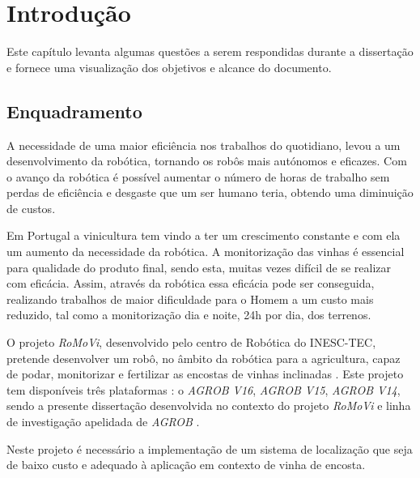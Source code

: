 \chapter{Introdução} \label{chap:introdução}
Este capítulo levanta algumas questões a serem respondidas durante a dissertação e fornece uma  visualização dos objetivos e alcance do documento.

\section{Enquadramento} \label{sec:enquadramento}
A necessidade de uma maior eficiência nos trabalhos do quotidiano, levou a um desenvolvimento da robótica, tornando os robôs mais autónomos e eficazes. Com o avanço da robótica é possível aumentar o número de horas de trabalho sem perdas de eficiência e desgaste que um ser humano teria, obtendo uma diminuição de custos.

Em Portugal a vinicultura tem vindo a ter um crescimento constante e com ela um aumento da necessidade da robótica. A monitorização das vinhas é essencial para qualidade do produto final, sendo esta, muitas vezes difícil de se realizar com eficácia. Assim,  através da robótica essa eficácia pode ser conseguida, realizando trabalhos de maior dificuldade para o Homem a um custo mais reduzido, tal como a monitorização dia e noite, 24h por dia,  dos terrenos. 

O projeto \textit{RoMoVi}, desenvolvido pelo centro de Robótica do INESC-TEC, pretende desenvolver um robô, no âmbito da robótica para a agricultura, capaz de podar, monitorizar e fertilizar as encostas de vinhas inclinadas \cite{Mendes2016}. Este projeto tem disponíveis três plataformas : o \textit{AGROB V16}, \textit{AGROB V15}, \textit{AGROB V14}, sendo a presente dissertação desenvolvida no contexto do projeto \textit{RoMoVi} e linha de investigação apelidada de \textit{AGROB} \cite{RN32}.

Neste projeto é necessário a implementação de um sistema de localização que seja de baixo custo e adequado à aplicação em contexto de vinha de encosta.

